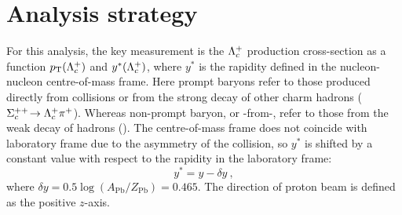 \section{Analysis strategy}
    For this analysis, the key measurement is the ${{\Lambda}^+_{c}}$ production cross-section
    as a function $p_{\mathrm{T}}({{\Lambda}^+_{c}})$ and $y^*({{\Lambda}^+_{c}})$,
    where $y^*$ is the rapidity defined in the nucleon-nucleon centre-of-mass frame.
    Here prompt \Lc baryons refer to those produced directly from collisions
    or from the strong decay of other charm hadrons (\eg $\Sigma_c^{++}\!\rightarrow {\ensuremath{{\Lambda}^+_{c}}}{\ensuremath{{\pi}^+}}$).
    Whereas non-prompt \Lc baryon, or \Lc-from-\bquark,
    refer to those from the weak decay of \B hadrons (\eg \decay{\Lb}{\Lc \pim}).
    The centre-of-mass frame does not coincide with laboratory frame
    due to the asymmetry of the collision, so $y^*$ is shifted by a constant value
    with respect to the rapidity in the laboratory frame:
    \begin{equation}\label{eqn:ystar}
        y^* = y - \delta y~,
    \end{equation}
    where \mbox{$\delta y = 0.5 \log (A_{\mathrm{Pb}}/Z_{\mathrm{Pb}}) = 0.465$}.
    The direction of proton beam is defined as the positive $z$-axis.

